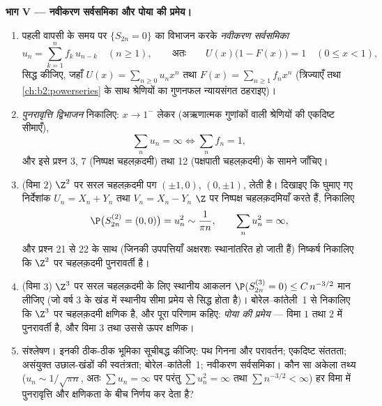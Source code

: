 \begin{problem}
\medskip
\noindent\textbf{भाग V --- नवीकरण सर्वसमिका और पोया की प्रमेय।}
\begin{enumerate}[resume]
  \item पहली वापसी के समय पर $\{S_{2n} = 0\}$ का विभाजन करके \emph{नवीकरण
        सर्वसमिका}
        \[
        u_n = \sum_{k=1}^n f_k\,u_{n-k} \quad (n \geq 1),
        \qquad\text{अतः}\qquad
        U(x)\bigl(1 - F(x)\bigr) = 1 \quad (0 \leq x < 1),
        \]
        सिद्ध कीजिए, जहाँ $U(x) = \sum_{n\geq0}u_nx^n$ तथा $F(x) =
        \sum_{n\geq1}f_nx^n$ (त्रिज्याएँ तथा \cref{ch:b2:powerseries} के
        साथ श्रेणियों का गुणनफल न्यायसंगत ठहराइए)।
  \item \emph{पुनरावृत्ति द्विभाजन} निकालिए: $x
        \to 1^-$ लेकर
        (अऋणात्मक गुणांकों वाली श्रेणियों की एकदिष्ट सीमाएँ),
        \[
        \sum_n u_n = \infty \iff \sum_n f_n = 1 ,
        \]
        और इसे प्रश्न 3, 7 (निष्पक्ष चहलक़दमी) तथा 12 (पक्षपाती
        चहलक़दमी) के सामने जाँचिए।
  \item (विमा $2$) $\Z^2$ पर सरल चहलक़दमी पग $(\pm1, 0)$, $(0, \pm1)$,  लेती है। दिखाइए कि घुमाए गए निर्देशांक $U_n = X_n + Y_n$ तथा
        $V_n = X_n
        - Y_n$ $\Z$ पर \emph{} निष्पक्ष चहलक़दमियाँ करते
        हैं, निकालिए
        \[
        \P\bigl(S^{(2)}_{2n} = (0,0)\bigr) = u_n^2 \sim
        \frac1{\pi n},
        \qquad \sum_n u_n^2 = \infty ,
        \]
        और प्रश्न 21 से 22 के साथ (जिनकी उपपत्तियाँ अक्षरशः
        स्थानांतरित हो जाती हैं) निष्कर्ष निकालिए कि $\Z^2$ पर
        चहलक़दमी पुनरावर्ती है।
  \item (विमा $3$) $\Z^3$ पर सरल चहलक़दमी के लिए स्थानीय आकलन
        $\P(S^{(3)}_{2n} = 0) \leq
        C\,n^{-3/2}$ मान लीजिए (जो वर्ष 3 के खंड में स्थानीय सीमा
        प्रमेय से सिद्ध होता है)। बोरेल--कांतेली~1 से निकालिए
        कि $\Z^3$ पर चहलक़दमी क्षणिक है, और पूरा परिणाम कहिए:
        \emph{पोया की प्रमेय} ---  विमा
        $1$ तथा $2$ में पुनरावर्ती है, और विमा $3$ तथा उससे
        ऊपर क्षणिक।
  \item संश्लेषण। इनकी ठीक-ठीक भूमिका सूचीबद्ध कीजिए: पथ गिनना
        और परावर्तन; एकदिष्ट संततता; असंयुक्त उछाल-खंडों की
        स्वतंत्रता; बोरेल--कांतेली~1; नवीकरण सर्वसमिका। कौन सा
        अकेला  तथ्य ($u_n \sim 1/\sqrt{\pi n}$, अतः $\sum u_n = \infty$ पर परंतु $\sum u_n^2 = \infty$ तथा
        $\sum n^{-3/2} < \infty$) हर विमा में पुनरावृत्ति और क्षणिकता के बीच निर्णय
        कर देता है?
\end{enumerate}
\end{problem}
